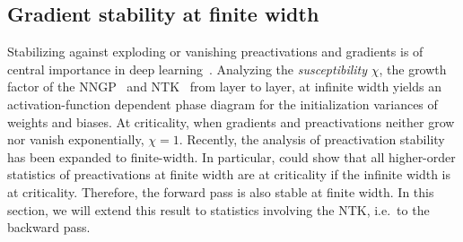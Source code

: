 \subsection{Gradient stability at finite width}\label{sec:stability}
Stabilizing against exploding or vanishing preactivations and gradients is of central importance in deep learning~\cite{glorot2010, he2015a}. Analyzing the \emph{susceptibility} $\chi$, the growth factor of the NNGP~\cite{poole2016} and NTK~\cite{xiao2020} from layer to layer, at infinite width yields an activation-function dependent phase diagram for the initialization variances of weights and biases. At criticality, when gradients and preactivations neither grow nor vanish exponentially, $\chi=1$.
Recently, the analysis of preactivation stability has been expanded to finite-width. In particular, \cite{banta2024} could show that all higher-order statistics of preactivations at finite width are at criticality if the infinite width is at criticality. Therefore, the forward pass is also stable at finite width. In this section, we will extend this result to statistics involving the NTK, i.e.\ to the backward pass.%


